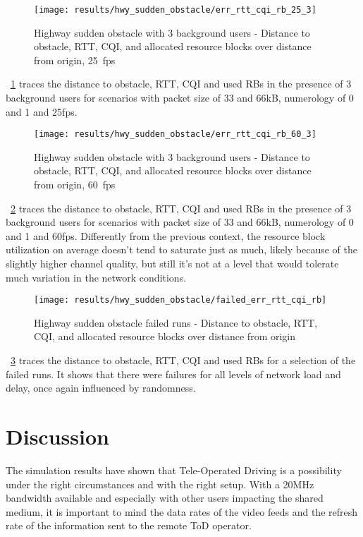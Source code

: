 \begin{figure}[H]
    \centering
    \texttt{[image: results/hwy\_sudden\_obstacle/err\_rtt\_cqi\_rb\_25\_3]}
    \caption{Highway sudden obstacle with 3 background users - Distance to obstacle, RTT, CQI, and allocated resource blocks over distance from origin, 25~fps}
    \label{fig:hwy_sudden_obstacle_err_rtt_cqi_rb_25_3}
\end{figure}

\figurename~\ref{fig:hwy_sudden_obstacle_err_rtt_cqi_rb_25_3} traces the distance to obstacle, RTT, CQI and used RBs in the presence of 3 background users for scenarios with packet size of 33 and 66kB, numerology of 0 and 1 and 25fps.

\begin{figure}[H]
    \centering
    \texttt{[image: results/hwy\_sudden\_obstacle/err\_rtt\_cqi\_rb\_60\_3]}
    \caption{Highway sudden obstacle with 3 background users - Distance to obstacle, RTT, CQI, and allocated resource blocks over distance from origin, 60~fps}
    \label{fig:hwy_sudden_obstacle_err_rtt_cqi_rb_60_3}
\end{figure}

\figurename~\ref{fig:hwy_sudden_obstacle_err_rtt_cqi_rb_60_3} traces the distance to obstacle, RTT, CQI and used RBs in the presence of 3 background users for scenarios with packet size of 33 and 66kB, numerology of 0 and 1 and 60fps. Differently from the previous context, the resource block utilization on average doesn't tend to saturate just as much, likely because of the slightly higher channel quality, but still it's not at a level that would tolerate much variation in the network conditions.

\begin{figure}[H]
    \centering
    \texttt{[image: results/hwy\_sudden\_obstacle/failed\_err\_rtt\_cqi\_rb]}
    \caption{Highway sudden obstacle failed runs - Distance to obstacle, RTT, CQI, and allocated resource blocks over distance from origin}
    \label{fig:hwy_sudden_obstacle_failed_err_rtt_cqi_rb_60_3}
\end{figure}

\figurename~\ref{fig:hwy_sudden_obstacle_failed_err_rtt_cqi_rb_60_3} traces the distance to obstacle, RTT, CQI and used RBs for a selection of the failed runs. It shows that there were failures for all levels of network load and delay, once again influenced by randomness.


\section{Discussion}
The simulation results have shown that Tele-Operated Driving is a possibility under the right circumstances and with the right setup. With a 20MHz bandwidth available and especially with other users impacting the shared medium, it is important to mind the data rates of the video feeds and the refresh rate of the information sent to the remote ToD operator.

